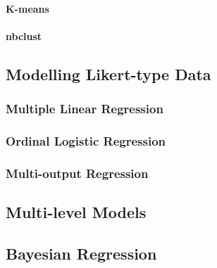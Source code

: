   \paragraph{K-means}
   \paragraph{nbclust}

 \subsection{Modelling Likert-type Data}

   \subsubsection{Multiple Linear Regression}

   \subsubsection{Ordinal Logistic Regression}

   \subsubsection{Multi-output Regression}

 \subsection{Multi-level Models}

 \subsection{Bayesian Regression}
